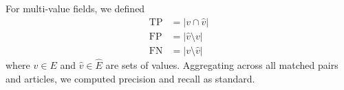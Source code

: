 For multi-value fields, we defined
\begin{align*}
    \mathrm{TP} &= |v \cap \hat{v}| \\
    \mathrm{FP} &= |\hat{v} \setminus v| \\
    \mathrm{FN} &= |v \setminus \hat{v}|
\end{align*}
where $v\in E$ and $\hat{v}\in\hat{E}$ are sets of values. Aggregating across all matched pairs and articles, we computed precision and recall as standard.




\clearpage

